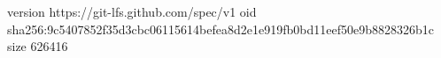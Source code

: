 version https://git-lfs.github.com/spec/v1
oid sha256:9c5407852f35d3cbc06115614befea8d2e1e919fb0bd11eef50e9b8828326b1c
size 626416
